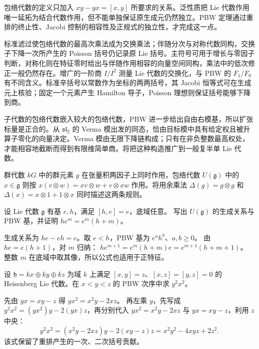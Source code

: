 




\begin{chaptersummary}
	包络代数的定义只加入 \(xy-yx=[x,y]\) 所要求的关系。泛性质把 Lie 代数作用唯一延拓为结合代数作用，但不能单独保证原生成元仍然独立。PBW 定理通过重排的终止性、Jacobi 控制的相容性及正规式的独立性，才完成这一点。

	\ProseParagraphBreak
	标准滤过使包络代数的最高次乘法成为交换乘法；伴随分次与对称代数同构，交换子下降一次所产生的 Poisson 括号仍记录原 Lie 括号。主符号可用于增长与零因子判断，对称化则在特征零时给出与伴随作用相容的向量空间同构，乘法中的低次修正一般仍然存在。增广的一阶商 \(I/I^2\) 测量 Lie 代数的交换化，与 PBW 的 \(F_1/F_0\) 有不同含义。标准辛括号以常数作为坐标的两两括号，其 Jacobi 恒等式可在生成元上核验；固定一个元素产生 Hamilton 导子，Poisson 理想则保证括号能够下降到商。

	\ProseParagraphBreak
	子代数的包络代数嵌入较大的包络代数，PBW 进一步给出自由右模基，所以扩张标量是正合的。从 \(\mathfrak{sl}_2\) 的 Verma 模出发的同态，恰由目标模中具有给定权且被升算子零化的向量决定。Verma 模由无限下降链构成；只有在非负整数最高权处，才能相容地截断而得到有限维简单商。将把这种构造推广到一般复半单 Lie 代数。

	\ProseParagraphBreak
	群代数 \(kG\) 中的群元素 \(g\) 在张量积两因子上同时作用，包络代数 \(U(\mathfrak g)\) 中的 \(x\in\mathfrak g\) 则按 \(x(v\otimes w)=xv\otimes w+v\otimes xw\) 作用。将用余乘法 \(\Delta(g)=g\otimes g\) 和 \(\Delta(x)=x\otimes1+1\otimes x\) 同时描述这两条规则。
\end{chaptersummary}

\BookExercises

\begin{exercise}\label{b5:ex:15-affine-enveloping}
	设 Lie 代数 \(\mathfrak g\) 有基 \(e,h\)，满足 \([h,e]=e\)，底域任意。 写出 \(U(\mathfrak g)\) 的生成关系与 PBW 基，并证明 \(he^m=e^m(h+m)\)。
\end{exercise}
\begin{solution}
	生成关系为 \(he-eh=e\)。取 \(e<h\)，PBW 基为 \(e^ah^b\)、\(a,b\ge0\)。 由 \(he=e(h+1)\)，对 \(m\) 归纳： \(he^{m+1}=e^m(h+m)e=e^{m+1}(h+m+1)\)。 整数 \(m\) 在底域中取其像，所以公式也适用于正特征。
\end{solution}

\begin{exercise}\label{b5:ex:15-heisenberg-order}
	设 \(\mathfrak h=kx\oplus ky\oplus kz\) 为域 \(k\) 上满足 \([x,y]=z\)、\([x,z]=[y,z]=0\) 的 Heisenberg Lie 代数。在 \(x<y<z\) 的 PBW 次序中求 \(y^2x^2\)。
\end{exercise}
\begin{solution}
	先由 \(yx=xy-z\) 得 \(yx^2=x^2y-2xz\)。 再左乘 \(y\)，先写成 \(y^2x^2=(yx^2)y-2(yx)z\)，再分别代入 \(yx^2=x^2y-2xz\) 与 \(yx=xy-z\)，利用 \(z\) 中央：
	\[
		y^2x^2=(x^2y-2xz)y-2(xy-z)z =x^2y^2-4xyz+2z^2.
	\]
	该式保留了重排产生的一次、二次括号贡献。
\end{solution}

